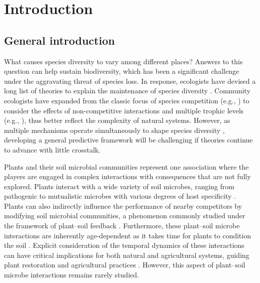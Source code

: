 \chapter{Introduction}
\fancyhead[LE, RO]{\thepage}
\fancyfoot{}
\renewcommand{\headrulewidth}{0pt}
\setlength{\parindent}{1cm}


\section{General introduction}
What causes species diversity to vary among different places? Answers to this question can help sustain biodiversity, which has been a significant challenge under the aggravating threat of species loss. In response, ecologists have devised a long list of theories to explain the maintenance of species diversity \citep{Vellend2016}. Community ecologists have expanded from the classic focus of species competition (e.g., \citealp{Gause1934}) to consider the effects of non-competitive interactions and multiple trophic levels (e.g., \citealp{Chesson2008b, Mccann2011, Bascompte2013}), thus better reflect the complexity of natural systems. However, as multiple mechanisms operate simultaneously to shape species diversity \citep{Amarasekare2007}, developing a general predictive framework will be challenging if theories continue to advance with little crosstalk.
\par


Plants and their soil microbial communities represent one association where the players are engaged in complex interactions with consequences that are not fully explored. Plants interact with a wide variety of soil microbes, ranging from pathogenic to mutualistic microbes with various degrees of host specificity \citep{Bever2010, vanderPutten2013}. Plants can also indirectly influence the performance of nearby competitors by modifying soil microbial communities, a phenomenon commonly studied under the framework of plant--soil feedback \citep{Bever1997, Bever2003}. Furthermore, these plant--soil microbe interactions are inherently age-dependent as it takes time for plants to condition the soil \citep{Kardol2013}. Explicit consideration of the temporal dynamics of these interactions can have critical implications for both natural and agricultural systems, guiding plant restoration and agricultural practices \citep{Kulmatiski2006, Mariotte2018}. However, this aspect of plant--soil microbe interactions remains rarely studied. 
\par 


